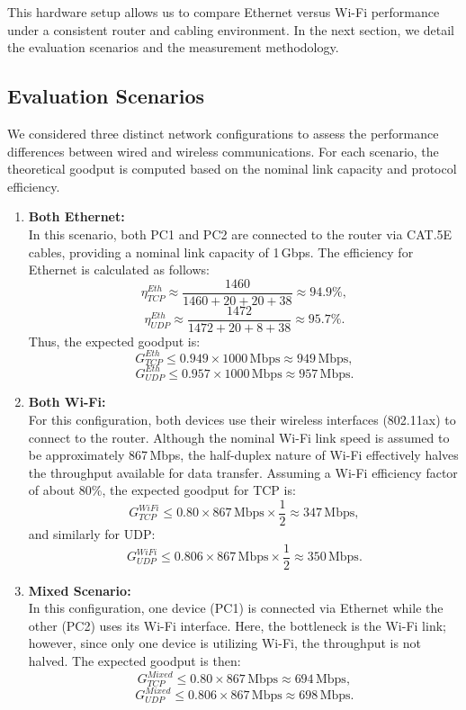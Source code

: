 \vspace{-0.1cm} %

This hardware setup allows us to compare Ethernet versus Wi-Fi performance under a consistent router and cabling environment. In the next section, we detail the evaluation scenarios and the measurement methodology.

\subsection{Evaluation Scenarios} \label{subsec:evaluation-scenarios}

We considered three distinct network configurations to assess the performance differences between wired and wireless communications. For each scenario, the theoretical goodput is computed based on the nominal link capacity and protocol efficiency.

\begin{enumerate}
    \item \textbf{Both Ethernet:} \\
    In this scenario, both PC1 and PC2 are connected to the router via CAT.5E cables, providing a nominal link capacity of 1\,Gbps. The efficiency for Ethernet is calculated as follows:
    \[
    \eta_{TCP}^{Eth} \approx \frac{1460}{1460 + 20 + 20 + 38} \approx 94.9\%,
    \]
    \[
    \eta_{UDP}^{Eth} \approx \frac{1472}{1472 + 20 + 8 + 38} \approx 95.7\%.
    \]
    Thus, the expected goodput is:
    \[
    G_{TCP}^{Eth} \leq 0.949 \times 1000\,\text{Mbps} \approx 949\,\text{Mbps},
    \]
    \[
    G_{UDP}^{Eth} \leq 0.957 \times 1000\,\text{Mbps} \approx 957\,\text{Mbps}.
    \]

    \vspace{0.2cm} %

    \item \textbf{Both Wi-Fi:} \\
    For this configuration, both devices use their wireless interfaces (802.11ax) to connect to the router. Although the nominal Wi-Fi link speed is assumed to be approximately 867\,Mbps, the half-duplex nature of Wi-Fi effectively halves the throughput available for data transfer. Assuming a Wi-Fi efficiency factor of about 80\%, the expected goodput for TCP is:
    \[
    G_{TCP}^{WiFi} \leq 0.80 \times 867\,\text{Mbps} \times \frac{1}{2} \approx 347\,\text{Mbps},
    \]
    and similarly for UDP:
    \[
    G_{UDP}^{WiFi} \leq 0.806 \times 867\,\text{Mbps} \times \frac{1}{2} \approx 350\,\text{Mbps}.
    \]


    \item \textbf{Mixed Scenario:} \\
    In this configuration, one device (PC1) is connected via Ethernet while the other (PC2) uses its Wi-Fi interface. Here, the bottleneck is the Wi-Fi link; however, since only one device is utilizing Wi-Fi, the throughput is not halved. The expected goodput is then:
    \[
    G_{TCP}^{Mixed} \leq 0.80 \times 867\,\text{Mbps} \approx 694\,\text{Mbps},
    \]
    \[
    G_{UDP}^{Mixed} \leq 0.806 \times 867\,\text{Mbps} \approx 698\,\text{Mbps}.
    \]
\end{enumerate}

